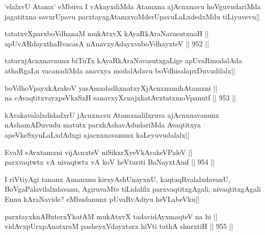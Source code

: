 \begin{artha}
`elalxvU Atamx' eMbuva I vAkayxdiMda Atamxna ajAcnxnavu hoVguvudariMda jagatitxna savxrUpavu parxtayxgAtamxvoMderUpavuLaLxdedxMdu tiLiyuvevu||
\end{artha}

\begin{shl}
tatatxvXparxboVdhanaM mukAtxvX kAyaRkAraNavasutxnaH || \\
apUvARdayxthaRvacasA nAnavxyAdayxvaboVdhayxteV ||  952 ||  
\end{shl}

\begin{artha}
tatavxjAcnxnavnunx biTuTx kAyaRkAraNavasutxgaLige apUvaRmodalAda athaRgaLu vacanadiMda anavxya modalAdavu boVdhisalapxDuvudilalx||
\end{artha}


\begin{shl}
boVdhoV\s payxkArakoV yasAmxdadhxnatxyXjAcnxnamihA\s \s tamxni || \\
na cA\s \s vaqtitxvayxpeVkaSxH sanavxyXcnajxkatAvxtatxmoVpanutf ||  953 ||  
\end{shl}

\begin{artha}
kArakavalalxdidadxrU jAcnxnavu Atamxnalilxruva ajAcnxnavanunx nAshamADuvudu matutx parxkAshavAdudariMda Avaqtitxya apeVkeSxyuLaLxdAdxgi ajacnxnavanunx kaLeyuvudalalx||
\end{artha}


\begin{shl}
EvaM sAvxtamxni vijAcnxteV niSikxrXyeV\s kArakeV\s PaleV || \\
parxvaqtwtx vA nivaqtwtx vA koV heVturiti BaNayxtAmf ||  954 ||  
\end{shl}

\begin{artha}
I riVtiyAgi tananx Amanxnu kirxyAshUnayxnU, kaqtaqRvalalxdavanU, BoVgaPalavilalxdavanu, AgiruvaMte tiLidalilx parxvaqtitxgAgali, nivaqtitxgAgali Ennu kAraNavide? eMbudanunx pUvaRvAdiyu heVLabeVku||
\end{artha}

\begin{shl}
parxtayxknABxterxYkatAM mukAtxvX tadavidAyxmaqteV na hi || \\
vidAvxpUrxpAnatxraM pasheyxVdayxtarx hiVti tathA shurxtiH ||  955 ||  
\end{shl}

